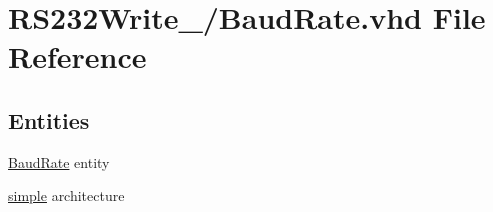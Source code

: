 \hypertarget{_r_s232_write__16_2_baud_rate_8vhd}{}\section{R\+S232\+Write\+\_/\+Baud\+Rate.vhd File Reference}
\label{_r_s232_write__16_2_baud_rate_8vhd}
\subsection*{Entities}
\begin{DoxyCompactItemize}
\item 
\hyperlink{class_baud_rate}{Baud\+Rate} entity
\item 
\hyperlink{class_baud_rate_1_1simple}{simple} architecture
\end{DoxyCompactItemize}
